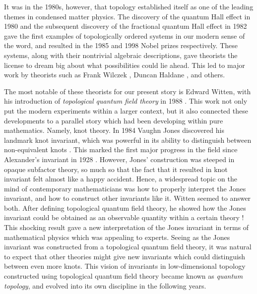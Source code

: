 \documentclass{article}
\theoremstyle{definition}
\numberwithin{figure}{section}
\begin{document}
It was in the 1980s, however, that topology established itself as one of the leading themes in condensed matter physics. The discovery of the quantum Hall effect in 1980 \cite{klitzing1980new} and the subsequent discovery of the fractional quantum Hall effect in 1982 \cite{tsui1982two} gave the first examples of topologically ordered systems in our modern sense of the word, and resulted in the 1985 and 1998 Nobel prizes respectively. These systems, along with their nontrivial algebraic descriptions, gave theorists the license to dream big about what possibilities could lie ahead. This led to major work by theorists such as Frank Wilczek \cite{wilczek1982quantum, arovas1985statistical}, Duncan Haldane \cite{haldane1983nonlinear, haldane1988model}, and others.

The most notable of these theorists for our present story is Edward Witten, with his introduction of \textit{topological quantum field theory} in 1988 \cite{witten1988topological}. This work not only put the modern experiments within a larger context, but it also connected these developments to a parallel story which had been developing within pure mathematics. Namely, knot theory. In 1984 Vaughn Jones discovered his landmark knot invariant, which was powerful in its ability to distinguish between non-equivalent knots \cite{jones1997polynomial}. This marked the first major progress in the field since Alexander's invariant in 1928 \cite{alexander1928topological}. However, Jones’ construction was steeped in opaque subfactor theory, so much so that the fact that it resulted in knot invariant felt almost like a happy accident. Hence, a widespread topic on the mind of contemporary mathematicians was how to properly interpret the Jones invariant, and how to construct other invariants like it. Witten seemed to answer both. After defining topological quantum field theory, he showed how the Jones invariant could be obtained as an observable quantity within a certain theory \cite{witten1989quantum}! This shocking result gave a new interpretation of the Jones invariant in terms of mathematical physics which was appealing to experts. Seeing as the Jones invariant was constructed from a topological quantum field theory, it was natural to expect that other theories might give new invariants which could distinguish between even more knots. This vision of invariants in low-dimensional topology constructed using topological quantum field theory became known as \textit{quantum topology}, and evolved into its own discipline in the following years.
\end{document}
